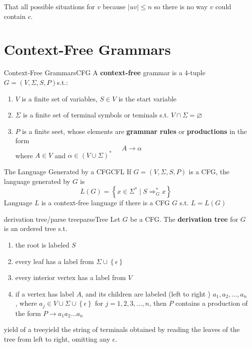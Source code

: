 \documentclass[a4paper]{article}
\begin{document}
That all possible situations for $v$ because  $|uv|\le n$ so there is no way $v$ could contain  $c$.


\newpage
\section{Context-Free Grammars}
\begin{Definition}{Context-Free Grammars}{CFG}
	A \textbf{context-free} grammar is a 4-tuple $G = \left( V, \Sigma, S, P \right) $s.t.:
\begin{enumerate}
\item $V$ is a finite set of variables, $S \in V$ is the start variable
\item $\Sigma$ is a finite set of terminal symbols or teminals s.t.  $V \cap \Sigma  = \varnothing$
\item $P$ is a finite seet, whose elements are  \textbf{grammar rules} or \textbf{productions} in the form \[
A \to \alpha
\] 
where $A \in  V$ and $\alpha \in (V \cup \Sigma)^*$
	
\end{enumerate}
	
\end{Definition}

\begin{Definition}{The Language Generated by a CFG}{CFL}
	If $G=\left( V, \Sigma, S,P \right) $ is a CFG, the language generated by  $G$ is  \[
		L(G) = \left\{ x \in \Sigma^* \mid S \Longrightarrow_G^* x \right\} 
	\] 
	Language $L$ is a context-free language if there is a CFG  $G$ s.t.  $L = L(G)$
\end{Definition}


\begin{Definition}{derivation tree/parse tree}{parseTree}
Let $G$ be a CFG. The  \textbf{derivation tree} for $G$ is an ordered tree s.t.
 \begin{enumerate}
\item the root is labeled $S$
\item every leaf has a label from  $\Sigma \cup \left\{ \epsilon \right\} $ 
\item every interior vertex has a label from $V$
\item if a vertex has label  $A$, and its children are labeled (left to right ) $a_1,a_2,\ldots,a_n$, where $a_j \in V\cup \Sigma \cup \left\{ \epsilon \right\} $ for $j = 1,2,3,\ldots,n$, then $P$ contains a production of the form  $P\to a_1a_2\ldots a_n$
\end{enumerate}
\end{Definition}
\begin{Definition}{yield of a tree}{yield}
the string of terminals obtained by reading the leaves of the tree from left to right, omitting any $\epsilon$.
	
\end{Definition}
\end{document}
